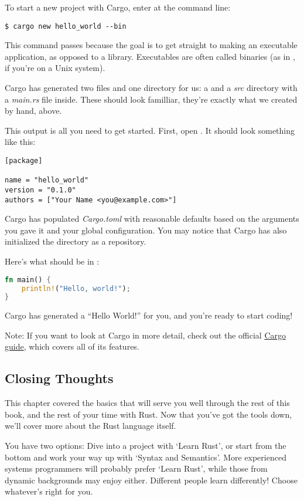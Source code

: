 \blank

To start a new project with Cargo, enter  at the command line:

\begin{verbatim}
$ cargo new hello_world --bin
\end{verbatim}

This command passes  because the goal is to get straight to making an executable application, as opposed to a 
library. Executables are often called binaries (as in , if you’re on a Unix system).

\blank

Cargo has generated two files and one directory for us: a  and a \emph{src} directory with a \emph{main.rs}
file inside. These should look familliar, they’re exactly what we created by hand, above.

\blank

This output is all you need to get started. First, open . It should look something like this:

\begin{verbatim}
[package]

name = "hello_world"
version = "0.1.0"
authors = ["Your Name <you@example.com>"]  
\end{verbatim}

Cargo has populated \emph{Cargo.toml} with reasonable defaults based on the arguments you gave it and your 
global configuration. You may notice that Cargo has also initialized the  directory as a  
repository.

\blank

Here’s what should be in :

\begin{lstlisting}[language=Rust]
fn main() {
    println!("Hello, world!");
}
\end{lstlisting}

Cargo has generated a \enquote{Hello World!} for you, and you’re ready to start coding!

\begin{myquote}
Note: If you want to look at Cargo in more detail, check out the official \href{http://doc.crates.io/guide.html}{Cargo guide}, 
which covers all of its features.
\end{myquote}

\subsection{Closing Thoughts}

This chapter covered the basics that will serve you well through the rest of this book, and the rest of your time with Rust. 
Now that you’ve got the tools down, we'll cover more about the Rust language itself.

\blank

You have two options: Dive into a project with ‘Learn Rust’, or start from the bottom and work your way up with 
‘Syntax and Semantics’. More experienced systems programmers will probably prefer ‘Learn Rust’, while those from 
dynamic backgrounds may enjoy either. Different people learn differently! Choose whatever’s right for you.
